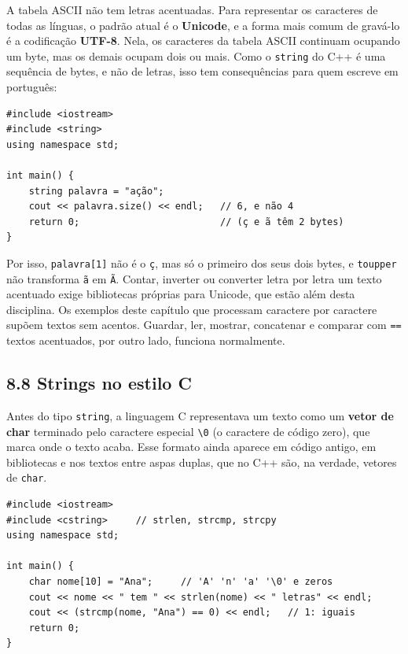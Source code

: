 A tabela ASCII não tem letras acentuadas. Para representar os caracteres de todas as línguas, o padrão atual é o \textbf{Unicode}, e a forma mais comum de gravá-lo é a codificação \textbf{UTF-8}. Nela, os caracteres da tabela ASCII continuam ocupando um byte, mas os demais ocupam dois ou mais. Como o \texttt{string} do C++ é uma sequência de bytes, e não de letras, isso tem consequências para quem escreve em português:

\begin{codigo}
\begin{Verbatim}[breaklines=true, breaksymbolleft={}, fontsize=\footnotesize]
#include <iostream>
#include <string>
using namespace std;

int main() {
    string palavra = "ação";
    cout << palavra.size() << endl;   // 6, e não 4
    return 0;                         // (ç e ã têm 2 bytes)
}
\end{Verbatim}
\end{codigo}

Por isso, \texttt{palavra[1]} não é o \texttt{\textquotesingle{}ç\textquotesingle{}}, mas só o primeiro dos seus dois bytes, e \texttt{toupper} não transforma \texttt{\textquotesingle{}ã\textquotesingle{}} em \texttt{\textquotesingle{}Ã\textquotesingle{}}. Contar, inverter ou converter letra por letra um texto acentuado exige bibliotecas próprias para Unicode, que estão além desta disciplina. Os exemplos deste capítulo que processam caractere por caractere supõem textos sem acentos. Guardar, ler, mostrar, concatenar e comparar com \texttt{==} textos acentuados, por outro lado, funciona normalmente.

\subsection{8.8 Strings no estilo C}

Antes do tipo \texttt{string}, a linguagem C representava um texto como um \textbf{vetor de char} terminado pelo caractere especial \texttt{\textquotesingle{}\textbackslash 0\textquotesingle{}} (o caractere de código zero), que marca onde o texto acaba. Esse formato ainda aparece em código antigo, em bibliotecas e nos textos entre aspas duplas, que no C++ são, na verdade, vetores de \texttt{char}.

\begin{codigo}
\begin{Verbatim}[breaklines=true, breaksymbolleft={}, fontsize=\footnotesize]
#include <iostream>
#include <cstring>     // strlen, strcmp, strcpy
using namespace std;

int main() {
    char nome[10] = "Ana";     // 'A' 'n' 'a' '\0' e zeros
    cout << nome << " tem " << strlen(nome) << " letras" << endl;
    cout << (strcmp(nome, "Ana") == 0) << endl;   // 1: iguais
    return 0;
}
\end{Verbatim}
\end{codigo}

